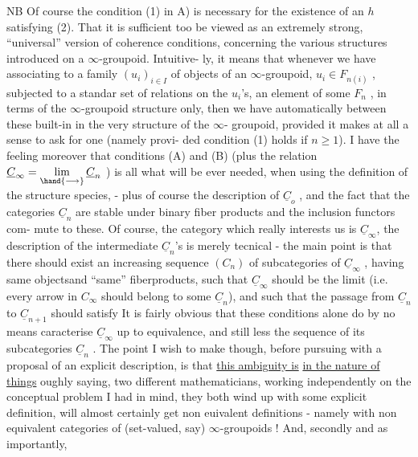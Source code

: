NB  Of course the condition (1) in A) is necessary for the existence
\margin{$\|$}of an $h$ satisfying (2).  That it is sufficient too  be viewed as an
extremely strong, ``universal'' version of coherence conditions,
concerning the various structures introduced on a $\infty$-groupoid. Intuitive-%
ly,  it means that whenever we have  associating to a  family 
$(u_i)_{i\in I}$  of objects of an $\infty$-groupoid,  $u_i \in F_{n(i)}$ ,   subjected
to a standar set of relations on the $u_i$'s, an element of some $F_n$ ,  in
terms of the $\infty$-groupoid structure only,  then we have automatically
 between these built-in in the very structure of the $\infty$-%
groupoid,  provided it makes at all a sense to ask for one (namely provi-%
ded condition (1) holds if $n \geq 1$).   I have the feeling moreover that
conditions (A) and (B) (plus the relation $\underline{C}_\infty = \mathop{\mathrm{lim}}\limits_{\hand{\longrightarrow}} \underline{C}_n$ ) is all what will
be ever needed,  when using the definition of the structure species,
- plus of course the description of $\underline{C}_o$ , and the  fact that the categories
$\underline{C}_n$ are stable under binary fiber products and the inclusion functors com-%
mute to these. Of course,  the category which really interests us is
$\underline{C}_\infty$,  the description of the intermediate $\underline{C}_n$'s\hand{$|$} is merely tecnical  -
the main point is that there should exist an increasing sequence $(C_n)$ of
subcategories of $\underline{C}_\infty$ ,  having same objects\over{,}{(}and ``same'' fiberproducts\over{,}{)},
such that $\underline{C}_\infty$ should be the limit (i.e. every arrow in $C_\infty$ should belong 
to some $\underline{C}_n$),  and such that the passage from $\underline{C}_n$ to $\underline{C}_{n+1}$ should satisfy 
 It is fairly obvious that these conditions alone do by no means
caracterise $\underline{C}_\infty$  up to equivalence,  and still less the sequence of its
subcategories $\underline{C}_n$ .  The point I wish to make though,  before pursuing
with a proposal of an explicit description,  is  that \uline{this ambiguity is}
\uline{in the nature of things} oughly saying, two different mathematicians,
working independently on the conceptual problem I had in mind,  
they both wind up with some explicit definition,  will almost certainly
get non euivalent definitions  -  namely with non equivalent categories
of (set-valued, say) $\infty$-groupoids !  And, secondly and as importantly,

